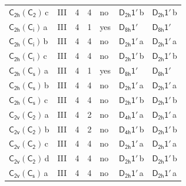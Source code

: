 \documentclass[10pt,a4paper]{article}
\numberwithin{equation}{section}
\newcommand{\grp}[1]{\mathsf{#1}}
\newcommand{\clsletter}[1]{\,{\scriptsize\color{black!55}#1}}
\begin{document}
{\begin{longtable}{@{}llrrlll@{}}
\href{C2h-C2.pdf}{$\grp{C_{2h}}(\grp{C_{2}})$}\clsletter{c} & III & 4 & 4 & no & \href{D2h-1p.pdf}{$\grp{D_{2h}1'}$}\clsletter{b} & \href{D2h-1p.pdf}{$\grp{D_{2h}1'}$}\clsletter{b}\\
\href{C2h-S2.pdf}{$\grp{C_{2h}}(\grp{C_{i}})$}\clsletter{a} & III & 4 & 1 & yes & \href{D8h-1p.pdf}{$\grp{D_{8h}1'}$} & \href{D8h-1p.pdf}{$\grp{D_{8h}1'}$}\\
\href{C2h-S2.pdf}{$\grp{C_{2h}}(\grp{C_{i}})$}\clsletter{b} & III & 4 & 4 & no & \href{D2h-1p.pdf}{$\grp{D_{2h}1'}$}\clsletter{a} & \href{D2h-1p.pdf}{$\grp{D_{2h}1'}$}\clsletter{a}\\
\href{C2h-S2.pdf}{$\grp{C_{2h}}(\grp{C_{i}})$}\clsletter{c} & III & 4 & 4 & no & \href{D2h-1p.pdf}{$\grp{D_{2h}1'}$}\clsletter{b} & \href{D2h-1p.pdf}{$\grp{D_{2h}1'}$}\clsletter{b}\\
\href{C2h-C1v.pdf}{$\grp{C_{2h}}(\grp{C_{s}})$}\clsletter{a} & III & 4 & 1 & yes & \href{D8h-1p.pdf}{$\grp{D_{8h}1'}$} & \href{D8h-1p.pdf}{$\grp{D_{8h}1'}$}\\
\href{C2h-C1v.pdf}{$\grp{C_{2h}}(\grp{C_{s}})$}\clsletter{b} & III & 4 & 4 & no & \href{D2h-1p.pdf}{$\grp{D_{2h}1'}$}\clsletter{a} & \href{D2h-1p.pdf}{$\grp{D_{2h}1'}$}\clsletter{a}\\
\href{C2h-C1v.pdf}{$\grp{C_{2h}}(\grp{C_{s}})$}\clsletter{c} & III & 4 & 4 & no & \href{D2h-1p.pdf}{$\grp{D_{2h}1'}$}\clsletter{b} & \href{D2h-1p.pdf}{$\grp{D_{2h}1'}$}\clsletter{b}\\
\href{C2v-C2.pdf}{$\grp{C_{2v}}(\grp{C_{2}})$}\clsletter{a} & III & 4 & 2 & no & \href{D4h-1p.pdf}{$\grp{D_{4h}1'}$}\clsletter{a} & \href{D2h-1p.pdf}{$\grp{D_{2h}1'}$}\clsletter{a}\\
\href{C2v-C2.pdf}{$\grp{C_{2v}}(\grp{C_{2}})$}\clsletter{b} & III & 4 & 2 & no & \href{D4h-1p.pdf}{$\grp{D_{4h}1'}$}\clsletter{b} & \href{D2h-1p.pdf}{$\grp{D_{2h}1'}$}\clsletter{b}\\
\href{C2v-C2.pdf}{$\grp{C_{2v}}(\grp{C_{2}})$}\clsletter{c} & III & 4 & 4 & no & \href{D2h-1p.pdf}{$\grp{D_{2h}1'}$}\clsletter{a} & \href{D2h-1p.pdf}{$\grp{D_{2h}1'}$}\clsletter{a}\\
\href{C2v-C2.pdf}{$\grp{C_{2v}}(\grp{C_{2}})$}\clsletter{d} & III & 4 & 4 & no & \href{D2h-1p.pdf}{$\grp{D_{2h}1'}$}\clsletter{b} & \href{D2h-1p.pdf}{$\grp{D_{2h}1'}$}\clsletter{b}\\
\href{C2v-C1v.pdf}{$\grp{C_{2v}}(\grp{C_{s}})$}\clsletter{a} & III & 4 & 4 & no & \href{D2h-1p.pdf}{$\grp{D_{2h}1'}$}\clsletter{a} & \href{D2h-1p.pdf}{$\grp{D_{2h}1'}$}\clsletter{a}\\

\end{longtable}}
\end{document}
